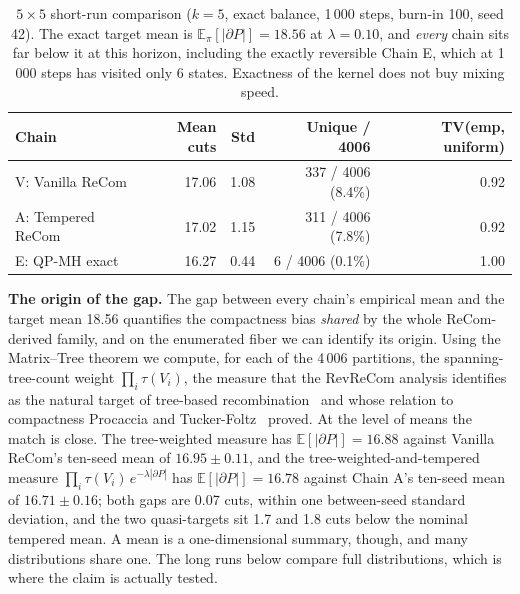 \documentclass[11pt]{article}
\newcommand{\E}{\mathbb{E}}
\begin{document}
\begin{table}[htbp]
\centering
\small
\begin{tabular}{lrrrr}
\toprule
Chain & Mean cuts & Std & Unique / 4006 & TV(emp, uniform) \\
\midrule
V: Vanilla ReCom     & 17.06 & 1.08 & 337 / 4006 (8.4\%) & 0.92 \\
A: Tempered ReCom    & 17.02 & 1.15 & 311 / 4006 (7.8\%) & 0.92 \\
E: QP-MH exact       & 16.27 & 0.44 & \phantom{00}6 / 4006 (0.1\%) & 1.00 \\
\bottomrule
\end{tabular}
\caption{$5 \times 5$ short-run comparison ($k = 5$, exact balance,
  1\,000 steps, burn-in 100, seed 42). The exact target mean is
  $\E_\pi[|\partial P|] = 18.56$ at $\lambda = 0.10$, and \emph{every}
  chain sits far below it at this horizon, including the exactly
  reversible Chain E, which at 1\,000 steps has visited only 6 states. Exactness of the kernel does not buy mixing speed.}\label{tab:5x5-headline}
\end{table}

\textbf{The origin of the gap.} The
gap between every chain's empirical mean and the target mean 18.56
quantifies the compactness bias \emph{shared} by the whole
ReCom-derived family, and on the enumerated fiber we can identify its
origin. Using the Matrix--Tree theorem we compute, for each of the
4\,006 partitions, the spanning-tree-count weight
$\prod_i \tau(V_i)$, the measure that the RevReCom analysis
identifies as the natural target of tree-based
recombination~\cite{cannon2022spanning,autry2023metropolized} and
whose relation to compactness Procaccia and
Tucker-Foltz~\cite{procaccia2022compact} proved. At the level of
means the match is close. The tree-weighted measure has
$\E[|\partial P|] = 16.88$ against Vanilla ReCom's ten-seed mean of
$16.95 \pm 0.11$, and the tree-weighted-and-tempered measure
$\prod_i \tau(V_i)\, e^{-\lambda|\partial P|}$ has
$\E[|\partial P|] = 16.78$ against Chain A's ten-seed mean of
$16.71 \pm 0.16$; both gaps are 0.07 cuts, within one between-seed
standard deviation, and the two quasi-targets sit 1.7 and 1.8 cuts
below the nominal tempered mean. A mean is a one-dimensional summary,
though, and many distributions share one. The long runs below compare
full distributions, which is where the claim is actually tested.
\end{document}

